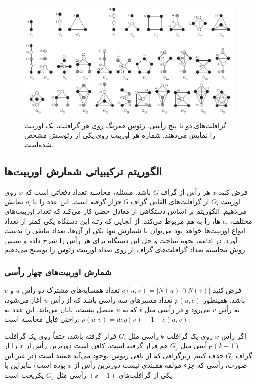 \begin{figure}[t]
\centering
\includegraphics[scale=0.4]{./graphlets.png}
\caption{گرافلت‌های دو تا پنج رأسی. رئوس همرنگ روی هر گرافلت، یک اوربیت را نمایش می‌دهند. شماره هر اوربیت روی یکی از رئوسش مشخص شده‌است.}
\label{fig:graphlets}
\end{figure}

\subsection{الگوریتم ترکیبیاتی شمارش اوربیت‌ها}
فرض کنید $x$ هر رأس از گراف $G$ باشد. مسئله، محاسبه تعداد دفعاتی است که $x$  روی اوربیت $O_i$ از گرافلت‌های القایی گراف $G$ قرار گرفته است. این عدد را با $o_i$ نمایش می‌دهیم. الگوریتم بر اساس دستگاهی از معادل خطی کار می‌کند که تعداد اوربیت‌های مختلف، $o_i$ ها، را به هم مربوط می‌کند. از آنجایی که رتبه این دستگاه یکی کمتر از تعداد انواع اوربیت‌ها خواهد بود می‌توان با شمارش تنها یکی از آن‌ها، تعداد مابقی را بدست آورد. در ادامه، نحوه ساخت و حل این دستگاه برای هر رأس را شرح داده و سپس روش محاسبه تعداد گرافلت‌های گراف از روی تعداد اوربیت رئوس را توضیح می‌دهیم.

\subsubsection{شمارش اوربیت‌های چهار رأسی}
فرض کنید $c(u,v) = |N(u) \cap N(v)|$ تعداد همسایه‌های مشترک دو رأس $u$ و $v$ باشد. همینطور $p(u,v)$ تعداد مسیرهای سه رأسی باشد که از رأس $u$ آغاز می‌شود، به رأس $v$ می‌رود و در رأسی مثل $t$ که به $u$ متصل نیست، پایان می‌یابد. این عدد به راحتی قابل محاسبه است: 
$p(u,v) = deg(v) -1 -c(u,v)$.

اگر رأس $x$ روی یک گرافلت $k$-رأسی مثل $G_i$ قرار گرفته باشد، حتماً روی یک گرافلت $(k-1)$-رأسی مثل $G_j$ هم قرار گرفته است، کافی است دورترین رأس از $x$ را از گراف $G_i$ حذف کنیم. زیرگرافی که از باقی رئوس بوجود می‌آید همبند است (در غیر این صورت، رأسی که جزء مؤلفه همبندی نیست دورترین رأس از $x$ بوده است) بنابراین با یکی از گرافلت‌های $(k-1)$-رأسی مثل $G_j$ یکریخت است.

